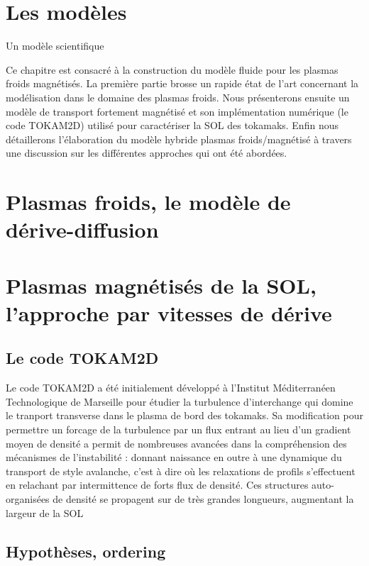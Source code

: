  	\section{Les modèles}
	\lipsum
 	Un modèle scientifique
 	
	Ce chapitre est consacré à la construction du modèle fluide pour les plasmas froids
	magnétisés. 
	La première partie brosse un rapide état de l'art concernant la modélisation dans le domaine des
	plasmas froids. Nous présenterons ensuite un modèle de transport
	fortement magnétisé et son implémentation numérique (le code TOKAM2D) utilisé pour caractériser 
	la SOL des tokamaks. Enfin nous détaillerons l'élaboration du modèle hybride plasmas 
	froids/magnétisé à travers une discussion sur les différentes approches qui ont été abordées. 
	
	\section{Plasmas froids, le modèle de dérive-diffusion}
	\section{Plasmas magnétisés de la SOL, l'approche par vitesses de dérive}
	 \subsection{Le code TOKAM2D}
	 Le code TOKAM2D a été initialement développé à l'Institut Méditerranéen Technologique de Marseille 
	 pour étudier la turbulence d'interchange qui domine le tranport transverse dans le plasma de bord des tokamaks. 
	 Sa modification pour permettre un forcage de la turbulence par un flux entrant au lieu d'un gradient moyen 
	 de densité a permit de nombreuses avancées dans la compréhension 
	 des mécanismes de l'instabilité : donnant naissance en outre à une dynamique du transport de style avalanche, 
	 c'est à dire où les relaxations de profils s'effectuent en relachant par intermittence de forts flux
	 de densité. Ces structures auto-organisées de densité se propagent sur de très grandes longueurs, augmentant la
	 largeur de la SOL
		\subsection{Hypothèses, ordering}

